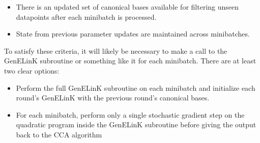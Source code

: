 \documentclass{article}
\begin{document}
	\begin{itemize}
		\item There is an updated set of canonical bases available for filtering unseen datapoints after each minibatch is processed.
		\item State from previous parameter updates are maintained across minibatches.
	\end{itemize}
	
	\noindent To satisfy these criteria, it will likely be necessary to make a call to the GenELinK subroutine or something like it for each minibatch. There are at least two clear options:
	
	\begin{itemize}
		\item Perform the full GenELinK subroutine on each minibatch and initialize each round's GenELinK with the previous round's canonical bases.
		\item For each minibatch, perform only a single stochastic gradient step on the quadratic program inside the GenELinK subroutine before giving the output back to the CCA algorithm
	\end{itemize}
	
	
	
\end{document}
